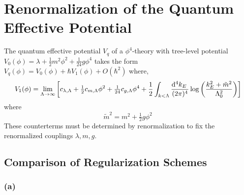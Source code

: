 \documentclass[12pt]{article}
\begin{document}

\section{Renormalization of the Quantum Effective Potential}

The quantum effective potential $V_q$ of a $\phi^4$-theory with tree-level potential $V_0(\phi) = \lambda + \tfrac{1}{2} m^2 \phi^2 + \tfrac{1}{24} g \phi^4$ takes the form $V_q(\phi) = V_0(\phi) + \hbar V_1(\phi) + O(\hbar^2)$ where,
\[ V_1(\phi) = \lim_{\Lambda \to \infty} \left[ c_{\lambda, \Lambda} + \tfrac{1}{2} c_{m,\Lambda} \phi^2 + \tfrac{1}{24} c_{g, \Lambda} \phi^4 + \frac{1}{2} \int_{k < \Lambda} \frac{\mathrm{d}^{4} k_E \:}{(2\pi)^4} \log{\left( \frac{k_E^2 + \tilde{m}^2}{\Lambda_0^2} \right)} \right] \]
where
\[ \tilde{m}^2 = m^2 + \tfrac{1}{2} g \phi^2 \]
These counterterms must be determined by renormalization to fix the renormalized couplings $\lambda, m, g$. 

\subsection{Comparison of Regularization Schemes}

\subsubsection*{(a)}
\end{document}
